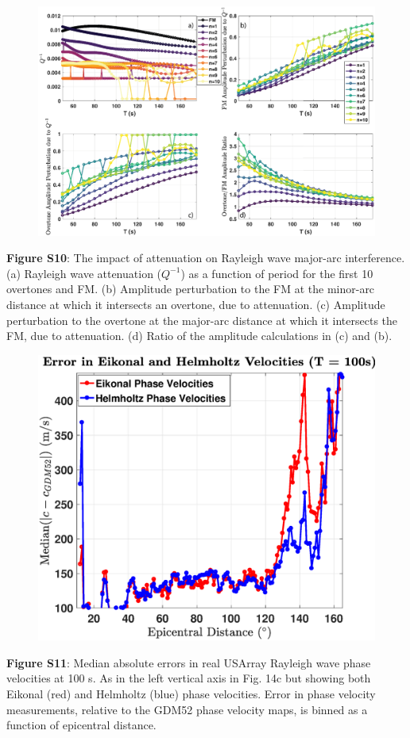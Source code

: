 \documentclass[extra,mreferee]{gji}
\begin{document}
\newpage
\begin{figure}
 \noindent\includegraphics[width=1\textwidth]{FigS10_VSver.eps}
\end{figure}
\textbf{Figure S10}: The impact of attenuation on Rayleigh wave major-arc interference. (a) Rayleigh wave attenuation ($Q^{-1}$) as a function of period for the first 10 overtones and FM. (b) Amplitude perturbation to the FM at the minor-arc distance at which it intersects an overtone, due to attenuation. (c) Amplitude perturbation to the overtone at the major-arc distance at which it intersects the FM, due to attenuation. (d) Ratio of the amplitude calculations in (c) and (b).

\newpage
\begin{figure}
 \noindent\includegraphics[width=1\textwidth]{FigS11_VSver.eps}
\end{figure}
\textbf{Figure S11}: Median absolute errors in real USArray Rayleigh wave phase velocities at 100 s. As in the left vertical axis in Fig. 14c but showing both Eikonal (red) and Helmholtz (blue) phase velocities. Error in phase velocity measurements, relative to the GDM52 phase velocity maps, is binned as a function of epicentral distance.  
\end{document}
